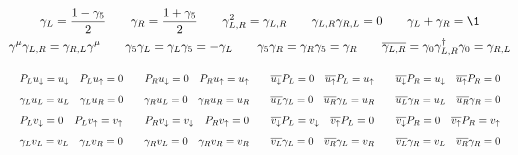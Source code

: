 \begin{gather*}
        \gamma_L = \frac{1 - \gamma_5}{2}
        \qquad
        \gamma_R = \frac{1 + \gamma_5}{2}
        \qquad
        \gamma_{L,R}^2 = \gamma_{L,R}
        \qquad
        \gamma_{L,R}\gamma_{R,L} = 0
        \qquad
        \gamma_L + \gamma_R = \1
        \\
        \gamma^\mu\gamma_{L,R} = \gamma_{R,L}\gamma^\mu
        \qquad
        \gamma_5\gamma_{L} = \gamma_{L}\gamma_5 = -\gamma_{L}
        \qquad
        \gamma_5\gamma_{R} = \gamma_{R}\gamma_5 = \gamma_{R}
        \qquad
        \overline{\gamma_{L,R}} = \gamma_0\gamma_{L,R}^\dagger\gamma_0 = \gamma_{R,L}
\end{gather*}

\begin{gather*}
        \resizebox{\linewidth}{!}{$\displaystyle
                P_Lu_\downarrow = u_\downarrow
                \quad
                P_Lu_\uparrow = 0
                \qquad
                P_Ru_\downarrow = 0
                \quad
                P_Ru_\uparrow = u_\uparrow
                \qquad
                \overline{u_\downarrow}P_L = 0
                \quad
                \overline{u_\uparrow}P_L = u_\uparrow
                \qquad
                \overline{u_\downarrow}P_R = u_\downarrow
                \quad
                \overline{u_\uparrow}P_R = 0
        $}
        \\\resizebox{\linewidth}{!}{$\displaystyle
                \gamma_Lu_L = u_L
                \quad
                \gamma_Lu_R = 0
                \qquad
                \gamma_Ru_L = 0
                \quad
                \gamma_Ru_R = u_R
                \qquad
                \overline{u_L}\gamma_L = 0
                \quad
                \overline{u_R}\gamma_L = u_R
                \qquad
                \overline{u_L}\gamma_R = u_L
                \quad
                \overline{u_R}\gamma_R = 0
        $}
        \\\resizebox{\linewidth}{!}{$\displaystyle
                P_Lv_\downarrow = 0
                \quad
                P_Lv_\uparrow = v_\uparrow
                \qquad
                P_Rv_\downarrow = v_\downarrow
                \quad
                P_Rv_\uparrow = 0
                \qquad
                \overline{v_\downarrow}P_L = v_\downarrow
                \quad
                \overline{v_\uparrow}P_L = 0
                \qquad
                \overline{v_\downarrow}P_R = 0
                \quad
                \overline{v_\uparrow}P_R =v_\uparrow
        $}
        \\\resizebox{\linewidth}{!}{$\displaystyle
                \gamma_Lv_L = v_L
                \quad
                \gamma_Lv_R = 0
                \qquad
                \gamma_Rv_L = 0
                \quad
                \gamma_Rv_R = v_R
                \qquad
                \overline{v_L}\gamma_L = 0
                \quad
                \overline{v_R}\gamma_L = v_R
                \qquad
                \overline{v_L}\gamma_R = v_L
                \quad
                \overline{v_R}\gamma_R = 0
        $}
\end{gather*}
